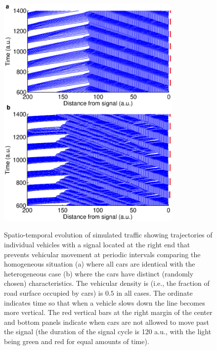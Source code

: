 \documentclass[conference]{IEEEtran}
\begin{document}
\begin{figure}
{    \includegraphics[width=9.0cm, angle=0]{figures/fig4.eps}}
\caption{Spatio-temporal evolution of simulated traffic showing trajectories
of individual vehicles with a signal located at the right end that
prevents vehicular movement at periodic intervals comparing the
homogeneous situation (a) where all cars are identical with the
heterogeneous case (b) where the cars have distinct (randomly chosen)
characteristics. The vehicular
density is (i.e., the fraction of road surface occupied by cars) is
$0.5$ in all cases. The ordinate indicates time so that when a vehicle
slows down the line becomes more vertical.
The red vertical bars at the right margin of the center and bottom
panels indicate when cars are not allowed to move past the signal
(the duration of the signal cycle is 120 a.u., with the light being
green and red for equal amounts of time).
}
    \label{spacetime}
\end{figure}
\end{document}
